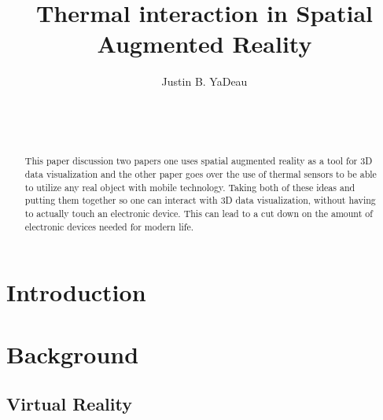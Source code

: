 \documentclass{sig-alternate}
\begin{document}

\title{Thermal interaction in Spatial Augmented Reality}


\author{
\alignauthor
Justin B. YaDeau\\
	\\
	\\
	\\
}

\maketitle

\begin{abstract}
This paper discussion two papers one uses spatial augmented reality as a tool for 3D data visualization and the other paper goes over the use of thermal sensors to be able to utilize any real object with mobile technology. Taking both of these ideas and putting them together so one can interact with 3D data visualization, without having to actually touch an electronic device. This can lead to a cut down on the amount of electronic devices needed for modern life.
\end{abstract}


\section{Introduction}
\label{sec:Introduction}



\section{Background}
\label{sec:background} 

\subsection{Virtual Reality}
\label{sec:Virtual Reality}
\end{document}
